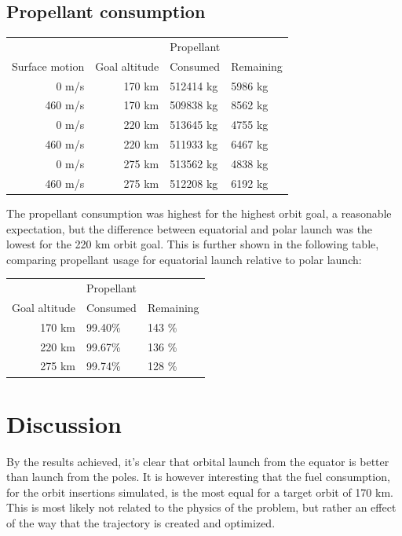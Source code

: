 \documentclass[11pt]{article}
\begin{document}
\subsection{Propellant consumption}
\begin{center}
  \begin{tabular}{ r | r  | l  l  }
     &   &   Propellant   \\
    Surface motion &  Goal altitude & Consumed & Remaining \\
    \hline
    0 m/s & 170 km & 512414 kg & 5986 kg \\
    460 m/s & 170 km & 509838 kg & 8562 kg \\
    \hline
    0 m/s & 220 km & 513645 kg & 4755 kg \\
    460 m/s & 220 km  & 511933 kg & 6467 kg \\
    \hline
    0 m/s & 275 km & 513562 kg & 4838 kg \\
    460 m/s & 275 km & 512208 kg & 6192 kg
  \end{tabular}
\end{center}
The propellant consumption was highest for the highest orbit goal, a reasonable expectation, but the difference between equatorial and polar launch was the lowest for the 220 km orbit goal.
This is further shown in the following table, comparing propellant usage for equatorial launch relative to polar launch:
\begin{center}
  \begin{tabular}{ r | l  l  }
     &   Propellant   \\
    Goal altitude & Consumed & Remaining \\
    \hline
    170 km & 99.40\% & 143 \% \\
    220 km & 99.67\% & 136 \% \\
    275 km & 99.74\% & 128 \%
  \end{tabular}
\end{center}


\section{Discussion}

By the results achieved, it's clear that orbital launch from the equator is better than launch from the poles. 
It is however interesting that the fuel consumption, for the orbit insertions simulated, is the most equal for a target orbit of 170 km. 
This is most likely not related to the physics of the problem, but rather an effect of the way that the trajectory is created and optimized.
\end{document}
